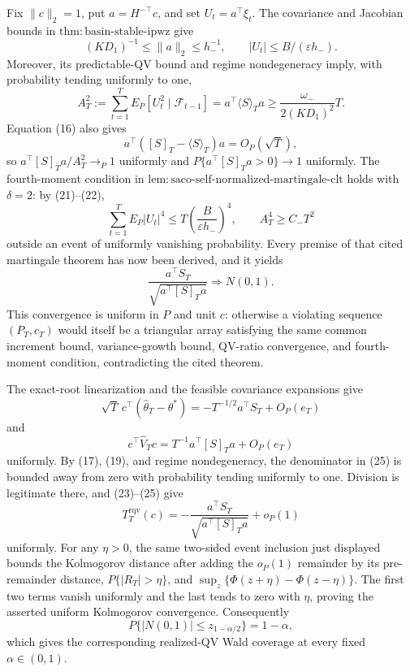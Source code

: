Fix \(\|c\|_2=1\), put \(a=H^{-\top}c\), and set \(U_t=a^\top\xi_t\). The covariance and Jacobian bounds in \(\mathrm{thm:basin\text{-}stable\text{-}ipwz}\) give
\[
 (KD_1)^{-1}\le\|a\|_2\le h_-^{-1},
 \qquad |U_t|\le B/(\varepsilon h_-).
\tag{21}
\]
Moreover, its predictable-QV bound and regime nondegeneracy imply, with probability tending uniformly to one,
\[
 A_T^2:=\sum_{t=1}^TE_P[U_t^2\mid\mathcal F_{t-1}]
 =a^\top\langle S\rangle_Ta
 \ge\frac{\omega_-}{2(KD_1)^2}T.
\tag{22}
\]
Equation (16) also gives
\[
 a^\top([S]_T-\langle S\rangle_T)a=O_P(\sqrt T),
\]
so \(a^\top[S]_Ta/A_T^2\to_P1\) uniformly and \(P\{a^\top[S]_Ta>0\}\to1\) uniformly. The fourth-moment condition in \(\mathrm{lem:saco\text{-}self\text{-}normalized\text{-}martingale\text{-}clt}\) holds with \(\delta=2\): by (21)--(22),
\[
 \sum_{t=1}^TE_P|U_t|^4\le T\left(\frac{B}{\varepsilon h_-}\right)^4,
 \qquad A_T^4\ge C_-T^2
\]
outside an event of uniformly vanishing probability. Every premise of that cited martingale theorem has now been derived, and it yields
\[
 \frac{a^\top S_T}{\sqrt{a^\top[S]_Ta}}\Rightarrow N(0,1).
\tag{23}
\]
This convergence is uniform in \(P\) and unit \(c\): otherwise a violating sequence \((P_T,c_T)\) would itself be a triangular array satisfying the same common increment bound, variance-growth bound, QV-ratio convergence, and fourth-moment condition, contradicting the cited theorem.

The exact-root linearization and the feasible covariance expansions give
\[
 \sqrt T\,c^\top(\widehat\theta_T-\theta^*)
 =-T^{-1/2}a^\top S_T+O_P(e_T)
\tag{24}
\]
and
\[
 c^\top\widehat V_Tc=T^{-1}a^\top[S]_Ta+O_P(e_T)
\tag{25}
\]
uniformly. By (17), (19), and regime nondegeneracy, the denominator in (25) is bounded away from zero with probability tending uniformly to one. Division is legitimate there, and (23)--(25) give
\[
 T_T^{\mathrm{rqv}}(c)
 =-\frac{a^\top S_T}{\sqrt{a^\top[S]_Ta}}+o_P(1)
\]
uniformly. For any \(\eta>0\), the same two-sided event inclusion just displayed bounds the Kolmogorov distance after adding the \(o_P(1)\) remainder by its pre-remainder distance, \(P\{|R_T|>\eta\}\), and \(\sup_z\{\Phi(z+\eta)-\Phi(z-\eta)\}\). The first two terms vanish uniformly and the last tends to zero with \(\eta\), proving the asserted uniform Kolmogorov convergence. Consequently
\[
 P\{|N(0,1)|\le z_{1-\alpha/2}\}=1-\alpha,
\]
which gives the corresponding realized-QV Wald coverage at every fixed \(\alpha\in(0,1)\).

